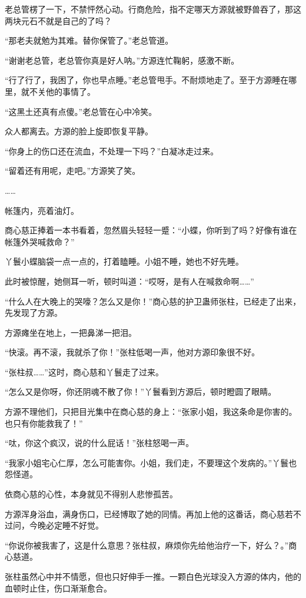 \begin{this_body}
老总管楞了一下，不禁怦然心动。行商危险，指不定哪天方源就被野兽吞了，那这两块元石不就是自己的了吗？

“那老夫就勉为其难。替你保管了。”老总管道。

“谢谢老总管，老总管你真是好人呐。”方源连忙鞠躬，感激不断。

“行了行了，我困了，你也早点睡。”老总管甩手。不耐烦地走了。至于方源睡在哪里，就不关他的事情了。

“这黑土还真有点傻。”老总管在心中冷笑。

众人都离去。方源的脸上旋即恢复平静。

“你身上的伤口还在流血，不处理一下吗？”白凝冰走过来。

“留着还有用呢，走吧。”方源笑了笑。

……

帐篷内，亮着油灯。

商心慈正捧着一本书看着，忽然眉头轻轻一蹙：“小蝶，你听到了吗？好像有谁在帐篷外哭喊救命？”

丫鬟小蝶脑袋一点一点的，打着瞌睡。小姐不睡，她也不好先睡。

此时被惊醒，她侧耳一听，顿时叫道：“哎呀，是有人在喊救命啊……”

“什么人在大晚上的哭嚎？怎么又是你！”商心慈的护卫蛊师张柱，已经走了出来，先发现了方源。

方源瘫坐在地上，一把鼻涕一把泪。

“快滚。再不滚，我就杀了你！”张柱低喝一声，他对方源印象很不好。

“张柱叔……”这时，商心慈和丫鬟走了过来。

“怎么又是你呀，你还阴魂不散了你！”丫鬟看到方源后，顿时瞪圆了眼睛。

方源不理他们，只把目光集中在商心慈的身上：“张家小姐，我这条命是你害的。也只有你能救我了！”

“呔，你这个疯汉，说的什么屁话！”张柱怒喝一声。

“我家小姐宅心仁厚，怎么可能害你。小姐，我们走，不要理这个发病的。”丫鬟也怨怪道。

依商心慈的心性，本身就见不得别人悲惨孤苦。

方源浑身浴血，满身伤口，已经博取了她的同情。再加上他的这番话，商心慈若不过问，今晚必定睡不好觉。

“你说你被我害了，这是什么意思？张柱叔，麻烦你先给他治疗一下，好么？。”商心慈道。

张柱虽然心中并不情愿，但也只好伸手一推。一颗白色光球没入方源的体内，他的血顿时止住，伤口渐渐愈合。


\end{this_body}
